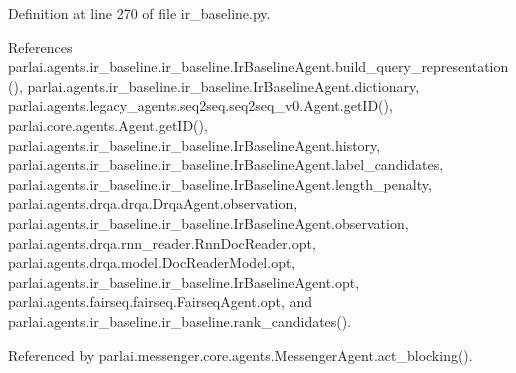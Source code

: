 Definition at line 270 of file ir\+\_\+baseline.\+py.



References parlai.\+agents.\+ir\+\_\+baseline.\+ir\+\_\+baseline.\+Ir\+Baseline\+Agent.\+build\+\_\+query\+\_\+representation(), parlai.\+agents.\+ir\+\_\+baseline.\+ir\+\_\+baseline.\+Ir\+Baseline\+Agent.\+dictionary, parlai.\+agents.\+legacy\+\_\+agents.\+seq2seq.\+seq2seq\+\_\+v0.\+Agent.\+get\+I\+D(), parlai.\+core.\+agents.\+Agent.\+get\+I\+D(), parlai.\+agents.\+ir\+\_\+baseline.\+ir\+\_\+baseline.\+Ir\+Baseline\+Agent.\+history, parlai.\+agents.\+ir\+\_\+baseline.\+ir\+\_\+baseline.\+Ir\+Baseline\+Agent.\+label\+\_\+candidates, parlai.\+agents.\+ir\+\_\+baseline.\+ir\+\_\+baseline.\+Ir\+Baseline\+Agent.\+length\+\_\+penalty, parlai.\+agents.\+drqa.\+drqa.\+Drqa\+Agent.\+observation, parlai.\+agents.\+ir\+\_\+baseline.\+ir\+\_\+baseline.\+Ir\+Baseline\+Agent.\+observation, parlai.\+agents.\+drqa.\+rnn\+\_\+reader.\+Rnn\+Doc\+Reader.\+opt, parlai.\+agents.\+drqa.\+model.\+Doc\+Reader\+Model.\+opt, parlai.\+agents.\+ir\+\_\+baseline.\+ir\+\_\+baseline.\+Ir\+Baseline\+Agent.\+opt, parlai.\+agents.\+fairseq.\+fairseq.\+Fairseq\+Agent.\+opt, and parlai.\+agents.\+ir\+\_\+baseline.\+ir\+\_\+baseline.\+rank\+\_\+candidates().



Referenced by parlai.\+messenger.\+core.\+agents.\+Messenger\+Agent.\+act\+\_\+blocking().

